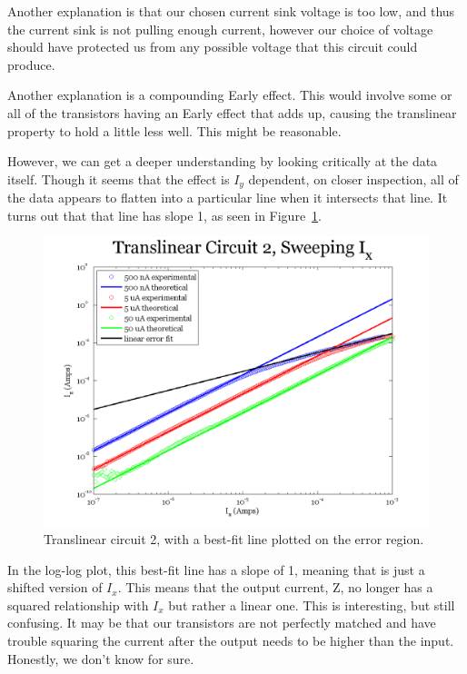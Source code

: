 \documentclass{article}
\begin{document}
Another explanation is that our chosen current sink voltage is too low, and thus the current sink is not pulling enough current, however our choice of voltage should have protected us from any possible voltage that this circuit could produce.

Another explanation is a compounding Early effect.  This would involve some or all of the transistors having an Early effect that adds up, causing the translinear property to hold a little less well.  This might be reasonable.

However, we can get a deeper understanding by looking critically at the data itself.  Though it seems that the effect is $I_y$ dependent, on closer inspection, all of the data appears to flatten into a particular line when it intersects that line.  It turns out that that line has slope 1, as seen in Figure~\ref{fig:err}.

\begin{figure}[H]
\begin{center}
\includegraphics[scale=.5]{exp3_sweepx_err.png}
\caption{Translinear circuit 2, with a best-fit line plotted on the error region.}
\label{fig:err}
\end{center}
\end{figure}

In the log-log plot, this best-fit line has a slope of 1, meaning that is just a shifted version of $I_x$.  This means that the output current, Z, no longer has a squared relationship with $I_x$ but rather a linear one.  This is interesting, but still confusing.  It may be that our transistors are not perfectly matched and have trouble squaring the current after the output needs to be higher than the input.  Honestly, we don't know for sure.
\end{document}
